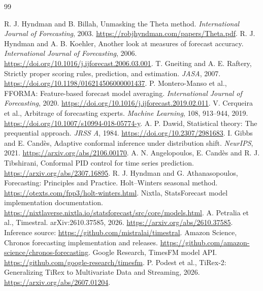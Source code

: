 \documentclass[11pt,a4paper]{article}
\begin{document}
\clearpage
\begingroup\small
\begin{thebibliography}{99}
\raggedright
{} R. J. Hyndman and B. Billah, Unmasking the Theta method. \emph{International Journal of Forecasting}, 2003. \url{https://robjhyndman.com/papers/Theta.pdf}.
 R. J. Hyndman and A. B. Koehler, Another look at measures of forecast accuracy. \emph{International Journal of Forecasting}, 2006. \url{https://doi.org/10.1016/j.ijforecast.2006.03.001}.
 T. Gneiting and A. E. Raftery, Strictly proper scoring rules, prediction, and estimation. \emph{JASA}, 2007. \url{https://doi.org/10.1198/016214506000001437}.
 P. Montero-Manso et al., FFORMA: Feature-based forecast model averaging. \emph{International Journal of Forecasting}, 2020. \url{https://doi.org/10.1016/j.ijforecast.2019.02.011}.
 V. Cerqueira et al., Arbitrage of forecasting experts. \emph{Machine Learning}, 108, 913--944, 2019. \url{https://doi.org/10.1007/s10994-018-05774-y}.
 A. P. Dawid, Statistical theory: The prequential approach. \emph{JRSS A}, 1984. \url{https://doi.org/10.2307/2981683}.
 I. Gibbs and E. Cand\`es, Adaptive conformal inference under distribution shift. \emph{NeurIPS}, 2021. \url{https://arxiv.org/abs/2106.00170}.
 A. N. Angelopoulos, E. Cand\`es and R. J. Tibshirani, Conformal PID control for time series prediction. \url{https://arxiv.org/abs/2307.16895}.
 R. J. Hyndman and G. Athanasopoulos, Forecasting: Principles and Practice. Holt--Winters seasonal method. \url{https://otexts.com/fpp3/holt-winters.html}.
 Nixtla, StatsForecast model implementation documentation. \url{https://nixtlaverse.nixtla.io/statsforecast/src/core/models.html}.
 A. Petralia et al., Timestral. arXiv:2610.37585, 2026. \url{https://arxiv.org/abs/2610.37585}. Inference source: \url{https://github.com/mistralai/timestral}.
 Amazon Science, Chronos forecasting implementation and releases. \url{https://github.com/amazon-science/chronos-forecasting}.
 Google Research, TimesFM model API. \url{https://github.com/google-research/timesfm}.
 P. Podest et al., TiRex-2: Generalizing TiRex to Multivariate Data and Streaming, 2026. \url{https://arxiv.org/abs/2607.01204}.


\end{thebibliography}
\end{document}
